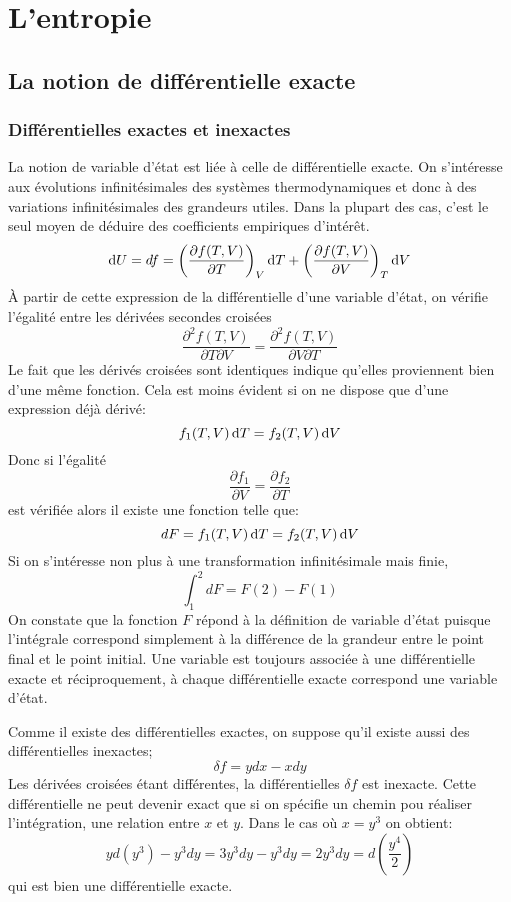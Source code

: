 \section{L'entropie}
\subsection{La notion de différentielle exacte}
\subsubsection{Différentielles exactes et inexactes}
La notion de variable d'état est liée à celle de différentielle exacte.
On s'intéresse aux évolutions infinitésimales des systèmes thermodynamiques et
donc à des variations infinitésimales des grandeurs utiles.
Dans la plupart des cas,
c'est le seul moyen de déduire des coefficients empiriques d'intérêt.
\[ \operatorname{d}\! U = df = \left(\frac{\partial f(T,V)}{\partial T}\right)_V \operatorname{d}\! T +
\left ( \frac{\partial f(T,V)}{\partial V}\right ) _T \operatorname{d}\! V \]
À partir de cette expression de la différentielle d'une variable d'état,
on vérifie l'égalité entre les dérivées secondes croisées
\[ \frac{\partial^2 f(T,V)}{\partial T \partial V} =
\frac{\partial^2 f(T,V)}{\partial V \partial T} \]
Le fait que les dérivés croisées sont identiques indique
qu'elles proviennent bien d'une même fonction.
Cela est moins évident si on ne dispose que d'une expression déjà dérivé:
\[ f_1(T,V) \operatorname{d}\! T = f_2(T,V)\operatorname{d}\! V \]
Donc si l'égalité
\[ \frac{\partial f_1}{\partial V} = \frac{\partial f_2}{\partial T} \]
est vérifiée alors il existe une fonction telle que:
\[ dF = f_1(T,V) \operatorname{d}\! T = f_2(T,V)\operatorname{d}\! V  \]
Si on s'intéresse non plus à une transformation infinitésimale mais finie,
\[ \int_1^2 dF = F(2)-F(1) \]
On constate que la fonction $F$ répond à la définition de variable d'état
puisque l'intégrale correspond simplement à la différence
de la grandeur entre le point final et le point initial.
Une variable est toujours associée à une différentielle exacte et
réciproquement, à chaque différentielle exacte correspond une variable d'état.

Comme il existe des différentielles exactes,
on suppose qu'il existe aussi des différentielles inexactes;
\[ \delta f = ydx -xdy \]
Les dérivées croisées étant différentes,
la différentielles $\delta f$ est inexacte.
Cette différentielle ne peut devenir exact que si
on spécifie un chemin pou réaliser l'intégration, une relation entre $x$ et $y$.
Dans le cas où $x = y^3$ on obtient:
\[  yd(y^3)-y^3dy = 3y^3dy-y^3dy = 2y^3dy = d\left(\frac{y^4}{2}\right) \]
qui est bien une différentielle exacte.

